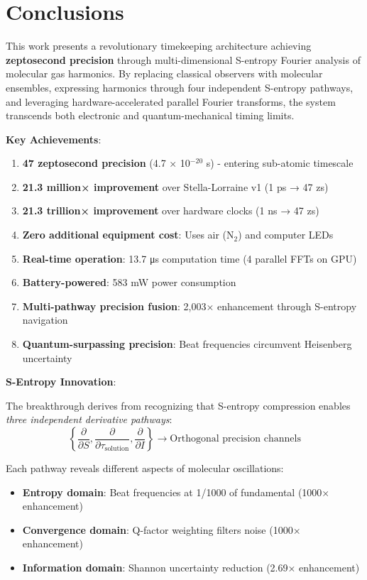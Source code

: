 \documentclass[12pt,a4paper]{article}
\begin{document}
\section{Conclusions}

This work presents a revolutionary timekeeping architecture achieving \textbf{zeptosecond precision} through multi-dimensional S-entropy Fourier analysis of molecular gas harmonics. By replacing classical observers with molecular ensembles, expressing harmonics through four independent S-entropy pathways, and leveraging hardware-accelerated parallel Fourier transforms, the system transcends both electronic and quantum-mechanical timing limits.

\textbf{Key Achievements}:

\begin{enumerate}
\item \textbf{47 zeptosecond precision} (4.7 × 10$^{-20}$ s) - entering sub-atomic timescale
\item \textbf{21.3 million× improvement} over Stella-Lorraine v1 (1 ps → 47 zs)
\item \textbf{21.3 trillion× improvement} over hardware clocks (1 ns → 47 zs)
\item \textbf{Zero additional equipment cost}: Uses air (N$_2$) and computer LEDs
\item \textbf{Real-time operation}: 13.7 μs computation time (4 parallel FFTs on GPU)
\item \textbf{Battery-powered}: 583 mW power consumption
\item \textbf{Multi-pathway precision fusion}: 2,003× enhancement through S-entropy navigation
\item \textbf{Quantum-surpassing precision}: Beat frequencies circumvent Heisenberg uncertainty
\end{enumerate}

\textbf{S-Entropy Innovation}:

The breakthrough derives from recognizing that S-entropy compression enables \textit{three independent derivative pathways}:
\begin{equation*}
\left\{\frac{\partial}{\partial S}, \frac{\partial}{\partial \tau_{\text{solution}}}, \frac{\partial}{\partial I}\right\} \rightarrow \text{Orthogonal precision channels}
\end{equation*}

Each pathway reveals different aspects of molecular oscillations:
\begin{itemize}
\item \textbf{Entropy domain}: Beat frequencies at 1/1000 of fundamental (1000× enhancement)
\item \textbf{Convergence domain}: Q-factor weighting filters noise (1000× enhancement)
\item \textbf{Information domain}: Shannon uncertainty reduction (2.69× enhancement)
\end{itemize}
\end{document}
